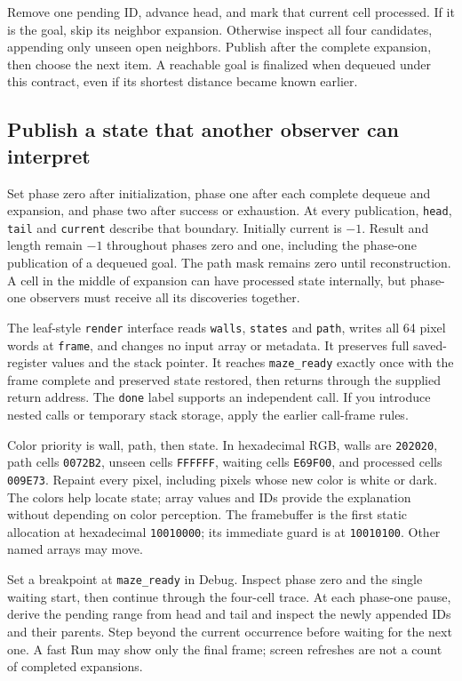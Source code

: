 Remove one pending ID, advance head, and mark that current cell processed.
If it is the goal, skip its neighbor expansion. Otherwise inspect all four
candidates, appending only unseen open neighbors. Publish after the complete
expansion, then choose the next item. A reachable goal is finalized when dequeued
under this contract, even if its shortest distance became known earlier.

\subsection*{Publish a state that another observer can interpret}

Set phase zero after initialization, phase one after each complete dequeue and
expansion, and phase two after success or exhaustion. At every publication,
\texttt{head}, \texttt{tail} and \texttt{current} describe that boundary. Initially
current is $-1$. Result and length remain $-1$ throughout phases zero and one,
including the phase-one publication of a dequeued goal. The path mask remains
zero until reconstruction. A cell in the middle of expansion can have processed
state internally, but phase-one observers must receive all its discoveries together.

The leaf-style \texttt{render} interface reads \texttt{walls}, \texttt{states}
and \texttt{path}, writes all 64 pixel words at \texttt{frame}, and changes no
input array or metadata. It preserves full saved-register values and the stack
pointer. It reaches \texttt{maze\_ready} exactly once with the frame complete
and preserved state restored, then returns through the supplied return address.
The \texttt{done} label supports an independent call. If you introduce nested
calls or temporary stack storage, apply the earlier call-frame rules.

Color priority is wall, path, then state. In hexadecimal RGB, walls are
\texttt{202020}, path cells \texttt{0072B2}, unseen cells \texttt{FFFFFF}, waiting
cells \texttt{E69F00}, and processed cells \texttt{009E73}. Repaint every pixel,
including pixels whose new color is white or dark. The colors help locate state;
array values and IDs provide the explanation without depending on color perception.
The framebuffer is the first static allocation at hexadecimal \texttt{10010000};
its immediate guard is at \texttt{10010100}. Other named arrays may move.

Set a breakpoint at \texttt{maze\_ready} in Debug. Inspect phase zero and the
single waiting start, then continue through the four-cell trace. At each phase-one
pause, derive the pending range from head and tail and inspect the newly appended
IDs and their parents. Step beyond the current occurrence before waiting for the
next one. A fast Run may show only the final frame; screen refreshes are not a
count of completed expansions.

